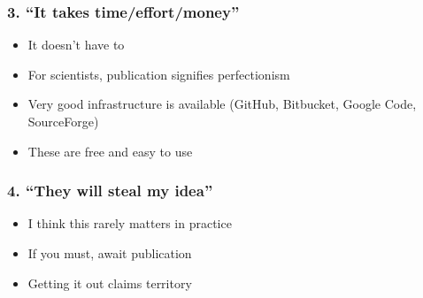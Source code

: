 \documentclass[slidestop]{beamer}
\begin{document}
\begin{frame}
  \frametitle{3. ``It takes time/effort/money''}
  \pause
  \begin{itemize}
    \item It doesn't have to
    \item For scientists, publication signifies perfectionism
    \item Very good infrastructure is available (GitHub, Bitbucket, Google
      Code, SourceForge)
    \item These are free and easy to use
  \end{itemize}
\end{frame}

\begin{frame}
  \frametitle{4. ``They will steal my idea''}
  \pause
  \begin{itemize}
    \item I think this rarely matters in practice
    \item If you must, await publication
    \item Getting it out claims territory %
  \end{itemize}
\end{frame}

{
  \frame{}
}

{
  \frame{}
}
\end{document}
